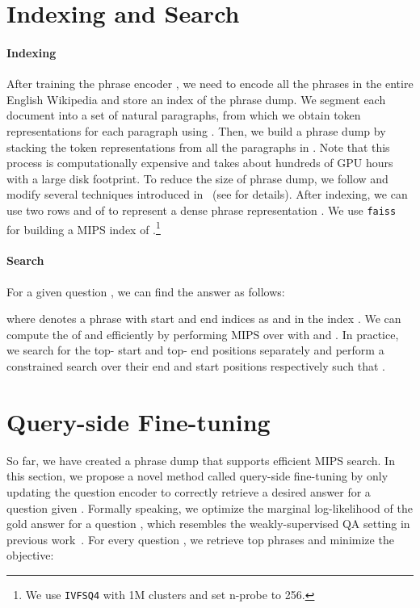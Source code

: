 \documentclass[11pt,a4paper]{article}
\begin{document}
\section{Indexing and Search}
\label{sec:indexing_and_search}

\paragraph{Indexing}
After training the phrase encoder , we need to encode all the phrases  in the entire English Wikipedia  and store an index of the phrase dump.
We segment each document  into a set of natural paragraphs, from which we obtain token representations for each paragraph using .
Then, we build a phrase dump  by stacking the token representations from all the paragraphs in .
Note that this process is computationally expensive and takes about hundreds of GPU hours with a large disk footprint.
To reduce the size of phrase dump, we follow and modify several techniques introduced in~\citet{seo2019real} (see  for details).
After indexing, we can use two rows  and  of  to represent a dense phrase representation . We use \texttt{faiss}~\citep{johnson2017billion} for building a MIPS index of .\footnote{We use \texttt{IVFSQ4} with 1M clusters and set n-probe to 256.}

\paragraph{Search}
For a given question , we can find the answer  as follows:
\vspace{-0.2em}

\noindent where  denotes a phrase with start and end indices as  and  in the index .
We can compute the  of  and  efficiently by performing MIPS over  with  and .
In practice, we search for the top- start and top- end positions separately and perform a constrained search over their end and start positions respectively such that .






\section{Query-side Fine-tuning}
\label{sec:qsft}
So far, we have created a phrase dump  that supports efficient MIPS search. In this section, we propose a novel method called {query-side fine-tuning} by only updating the question encoder  to correctly retrieve a desired answer  for a question  given .
Formally speaking, we optimize the marginal log-likelihood of the gold answer  for a question , which resembles the weakly-supervised QA setting in previous work~\citep{lee2019latent,min2019discrete}.
For every question , we retrieve top  phrases and minimize the objective:
\end{document}
